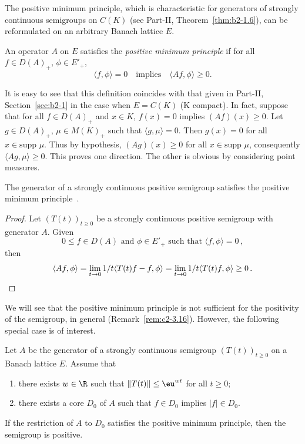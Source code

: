 The positive minimum principle, which is characteristic for generators of strongly continuous semigroups on $C(K)$ (see 
Part-II, Theorem~\ref{thm:b2-1.6}), can be reformulated on an arbitrary Banach lattice $E$.
\begin{definition}\label{def:c2-1.6}
%
An operator $A$ on $E$ satisfies the \emph{positive minimum principle} if for all $f \in D(A)_{+}$, $\phi \in E'_{+}$,
\begin{equation}\label{eq:c2-P} \tag{P}
\langle f,\phi \rangle = 0 \quad \text{implies} \quad \langle Af,\phi \rangle \geq 0.
\end{equation}
\end{definition}
\begin{remark*}\label{rem:c2-1.6}
%
It is easy to see that this definition coincides with that given in Part-II, Section~\ref{sec:b2-1} 
in the case when $E = C(K)$ (K compact).
In fact, suppose that for all $f \in D(A)_{+}$ and $x \in K$, $f(x) = 0$ implies $(Af)(x) \geq 0$.
Let $g \in D(A)_{+}$, $\mu \in M(K)_{+}$ such that $\langle g,\mu \rangle = 0$.
Then $g(x) = 0$ for all $x \in \text{supp } \mu$.
Thus by hypothesis, $(Ag)(x) \geq 0$ for all $x \in \text{supp } \mu$,
consequently $\langle Ag,\mu \rangle \geq 0$.
This proves one direction.
The other is obvious by considering point measures.
\end{remark*}
\begin{proposition}\label{prop:c2-1.7}
%
The generator of a strongly continuous positive semigroup satisfies the positive minimum 
principle~.
\end{proposition}
\begin{proof}
Let $(T(t))_{t \geq 0}$ be a strongly continuous positive semigroup with generator $A$. Given
\[
0 \leq f \in D(A) \text{ and } \phi \in E'_{+} \text{ such that } \langle f,\phi \rangle = 0\,,
\]
then 
\[
\langle Af,\phi \rangle = \lim_{t \to 0} 1/t \langle T(t)f - f, \phi \rangle = \lim_{t \to 0} 1/t \langle T(t)f, \phi \rangle \geq 0\,.
\qedhere
\]
\end{proof}
We will see that the positive minimum principle is not sufficient for the positivity of the semigroup, in general (Remark~\ref{rem:c2-3.16}).
However, the following special case is of interest.
\begin{theorem}\label{thm:c2-1.8}
%
Let $A$ be the generator of a strongly continuous semigroup $(T(t))_{t \geq 0}$ on a Banach lattice $E$.
Assume that
\begin{enumerate}[\upshape (i)]
\item \label{thm:c2-1.8-1}
there exists $w \in \R$ such that $\|T(t)\| \leq \eu^{wt}$ for all $t \geq 0$;
\item \label{thm:c2-1.8-2}
there exists a core $D_{0}$ of\/ $A$ such that $f \in D_{0}$ implies $|f| \in D_{0}$.
\end{enumerate}
If the restriction of\/ $A$ to $D_{0}$ satisfies the positive minimum principle, then the semigroup is positive.
\end{theorem}
